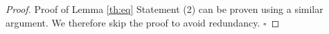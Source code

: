 \begin{proof}{Proof of Lemma \ref{th:eq}}
Statement (2) can be proven using a similar argument. We therefore skip the proof to avoid redundancy. $\square$
\end{proof}
